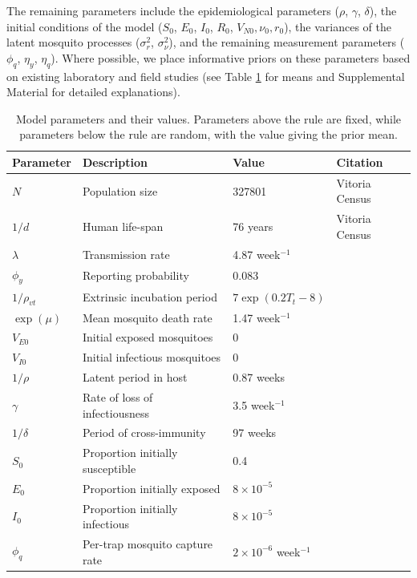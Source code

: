 \documentclass[10pt,letterpaper]{article}
\begin{document}
The remaining parameters include the epidemiological parameters ($\rho$, $\gamma$, $\delta$), the initial conditions of the model ($S_0$, $E_0$, $I_0$, $R_0$, $V_{N0}, \nu_0, r_0$), the variances of the latent mosquito processes ($\sigma^2_r$, $\sigma^2_{\nu}$), and the remaining measurement parameters ($\phi_q$, $\eta_y$, $\eta_q$).  
Where possible, we place informative priors on these parameters based on existing laboratory and field studies (see Table \ref{parameters} for means and Supplemental Material for detailed explanations).

\begin{table}[!ht]
\label{parameters}
\begin{adjustwidth}{-2.25in}{0in} 
\begin{center}
\caption{Model parameters and their values.  Parameters above the rule are fixed, while parameters below the rule are random, with the value giving the prior mean.}
\begin{tabular}{llll}
Parameter & Description & Value & Citation\\
\hline
$N$ & Population size & 327801 & Vitoria Census\\
$1/d$ & Human life-span & 76 years & Vitoria Census\\
$\lambda$ & Transmission rate & 4.87 week$^{-1}$ & \cite{Scott2000}\\
$\phi_y$ & Reporting probability & 0.083 & \cite{Silva2016}\\
$1/\rho_{vt}$ & Extrinsic incubation period & $7\exp \left( 0.2 T_t - 8 \right)$ & \cite{Chan2012}\\
$\exp(\mu)$ & Mean mosquito death rate & 1.47 week$^{-1}$ & \cite{Brady2013} \\
$V_{E0}$ & Initial exposed mosquitoes &  0 & \\
$V_{I0}$ & Initial infectious mosquitoes & 0 & \\
\hline
$1/\rho$ & Latent period in host & 0.87 weeks  & \cite{Chan2012}\\
$\gamma$ & Rate of loss of infectiousness & 3.5 week$^{-1}$ & \cite{Nguyet2013}\\
$1/\delta$ & Period of cross-immunity & 97 weeks &  \cite{Reich2013}\\
$S_0$ & Proportion initially susceptible & 0.4 & \cite{Cardoso2011a} \\
$E_0$ & Proportion initially exposed & $8\times 10 ^ {-5}$ & \\
$I_0$ & Proportion initially infectious & $8\times 10 ^ {-5}$ & \\
$\phi_q$ & Per-trap mosquito capture rate & $2 \times 10^{-6}$ week$^{-1}$ & 
\end{tabular}
\end{center}
\end{adjustwidth}
\end{table}
\end{document}
